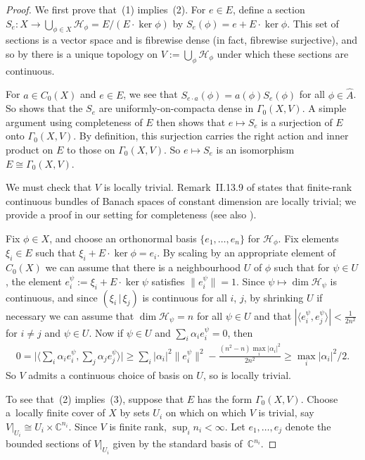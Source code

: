 \documentclass[pdftex]{sigma}
\numberwithin{equation}{section}
\newcommand{\C}{\mathbb{C}} %
\renewcommand{\H}{\mathcal{H}} %
\begin{document}
\begin{proof}
We f\/irst prove that~(1) implies~(2). For $e\in E$, def\/ine a section $S_e \colon X \to \bigcup_{\phi \in X} \H_\phi = E/(E \cdot \ker\phi)$ by $S_e(\phi) = e + E\cdot\ker\phi$. This set of sections is a vector space and is f\/ibrewise dense (in fact, f\/ibrewise surjective), and so by \cite[Theorem~II.13.18]{FellDoran} there is a unique topology on $V := \bigcup_\phi \H_\phi$ under which these sections are continuous.

For $a \in C_0(X)$ and $e \in E$, we see that $S_{e \cdot a}(\phi) = a(\phi)S_e(\phi)$ for all $\phi\in \hat{A}$. So \cite[Corollary~II.14.7]{FellDoran} shows that the $S_e$ are uniformly-on-compacta dense in $\Gamma_0(X, V)$. A simple argument using completeness
of $E$ then shows that $e \mapsto S_e$ is a surjection of $E$ onto $\Gamma_0(X, V)$. By def\/inition, this surjection carries the right action and inner product on $E$ to those on $\Gamma_0(X, V)$. So $e \mapsto S_e$ is an isomorphism $E \cong \Gamma_0(X, V)$.

We must check that $V$ is locally trivial. Remark~II.13.9 of \cite{FellDoran} states that f\/inite-rank continuous bundles of Banach spaces of constant dimension are locally trivial; we provide a proof in our setting for completeness (see also \cite[Remarque, p.~231]{DD}).

Fix $\phi \in X$, and choose an orthonormal basis $\{e_1, \dots, e_n\}$ for $\H_\phi$. Fix elements $\xi_i \in E$ such that $\xi_i + E \cdot \ker\phi = e_i$. By scaling by an appropriate element of $C_0(X)$ we can assume that there is a neighbourhood $U$ of $\phi$ such that for $\psi \in U$, the element $e^\psi_i := \xi_i + E \cdot \ker\psi$ satisf\/ies $\|e^\psi_i\| = 1$. Since $\psi \mapsto \dim\H_\psi$ is continuous, and since $(\xi_i \,|\, \xi_j)$ is continuous for all $i$, $j$, by shrinking $U$ if necessary we can assume that $\dim\H_\psi = n$ for all $\psi \in U$ and that $|\langle e^\psi_i, e^\psi_j\rangle| < \frac{1}{2n^2}$ for $i \not= j$ and $\psi \in U$. Now if $\psi \in U$ and $\sum_i \alpha_i e^\psi_i = 0$, then
\begin{gather*}
0 = \Big|\Big\langle \sum_i \alpha_i e^\psi_i, \sum_j \alpha_j e^\psi_j\Big\rangle\Big|
 \ge \sum_i |\alpha_i|^2 \|e^\psi_i\|^2 - \frac{(n^2-n) \max_i|\alpha_i|^2}{2n^2} \ge \max_i|\alpha_i|^2/2.
\end{gather*}
So $V$ admits a continuous choice of basis on $U$, so is locally trivial.

To see that~(2) implies~(3), suppose that $E$ has the form $\Gamma_0(X, V)$. Choose a~locally f\/inite cover of $X$ by sets $U_i$ on which on which $V$ is trivial, say $V|_{U_i} \cong U_i \times \C^{n_i}$. Since $V$ is f\/inite rank, $\sup_i n_i<\infty$. Let $e_1,\dots,e_j$ denote the bounded sections of $V|_{U_i}$ given by the standard basis of~$\C^{n_i}$.


\end{proof}
\end{document}
